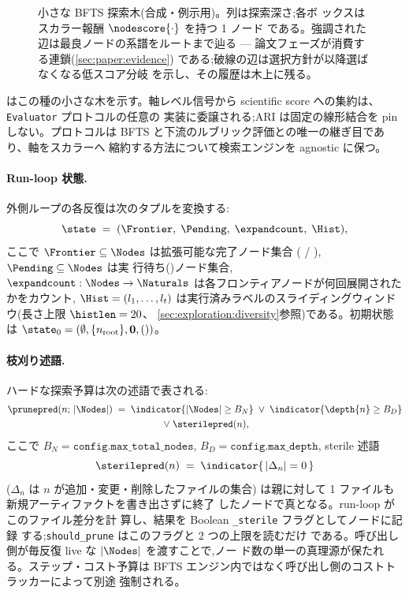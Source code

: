 \begin{figure}[t]
  \centering
  \resizebox{\columnwidth}{!}{}
  \caption{小さな BFTS 探索木(合成・例示用)。列は探索深さ;各ボ
           ックスはスカラー報酬 $\nodescore{\cdot}$ を持つ 1 ノード
           である。強調された辺は最良ノードの系譜をルートまで辿る
           — 論文フェーズが消費する連鎖(\cref{sec:paper:evidence})
           である;破線の辺は選択方針が以降選ばなくなる低スコア分岐
           を示し、その履歴は木上に残る。}
  \label{fig:tree}
\end{figure}

 はこの種の小さな木を示す。軸レベル信号から
scientific score への集約は、\texttt{Evaluator} プロトコルの任意の
実装に委譲される;ARI は固定の線形結合を pin しない。プロトコルは
BFTS と下流のルブリック評価との唯一の継ぎ目であり、軸をスカラーへ
縮約する方法について検索エンジンを agnostic に保つ。

\paragraph{Run-loop 状態.}
外側ループの各反復は次のタプルを変換する:
\[
  \state \;=\; (\Frontier,\;\Pending,\;\expandcount,\;\Hist),
\]
ここで $\Frontier\subseteq\Nodes$ は拡張可能な完了ノード集合
(\StateDone{} / \StateFailed{}), $\Pending\subseteq\Nodes$ は実
行待ち(\StateOpen{})ノード集合, $\expandcount:\Nodes\to\Naturals$
は各フロンティアノードが何回展開されたかをカウント, $\Hist=(l_1,\ldots,l_t)$
は実行済みラベルのスライディングウィンドウ(長さ上限 $\histlen=20$、
\cref{sec:exploration:diversity}参照)である。初期状態は
$\state_0=(\emptyset,\{n_\mathrm{root}\},\mathbf{0},())$。

\paragraph{枝刈り述語.}
ハードな探索予算は次の述語で表される:
\begin{multline}\label{eq:prune}
  \prunepred(n;\,|\Nodes|) \;=\;
    \indicator{|\Nodes| \geq B_N}
    \;\lor\;
    \indicator{\depth{n} \geq B_D}
    \\\;\lor\;
    \sterilepred(n),
\end{multline}
ここで $B_N = \texttt{config.max\_total\_nodes}$, $B_D =
\texttt{config.max\_depth}$, sterile 述語
\begin{equation}\label{eq:sterile}
  \sterilepred(n) \;=\; \indicator{\,|\Delta_n| = 0\,}
\end{equation}
($\Delta_n$ は $n$ が追加・変更・削除したファイルの集合)
は親に対して 1 ファイルも新規アーティファクトを書き出さずに終了
したノードで真となる。run-loop がこのファイル差分を計
算し、結果を Boolean \texttt{\_sterile} フラグとしてノードに記録
する;\texttt{should\_prune} はこのフラグと 2 つの上限を読むだけ
である。呼び出し側が毎反復 live な $|\Nodes|$ を渡すことで,ノー
ド数の単一の真理源が保たれる。ステップ・コスト予算は
BFTS エンジン内ではなく呼び出し側のコストトラッカーによって別途
強制される。

